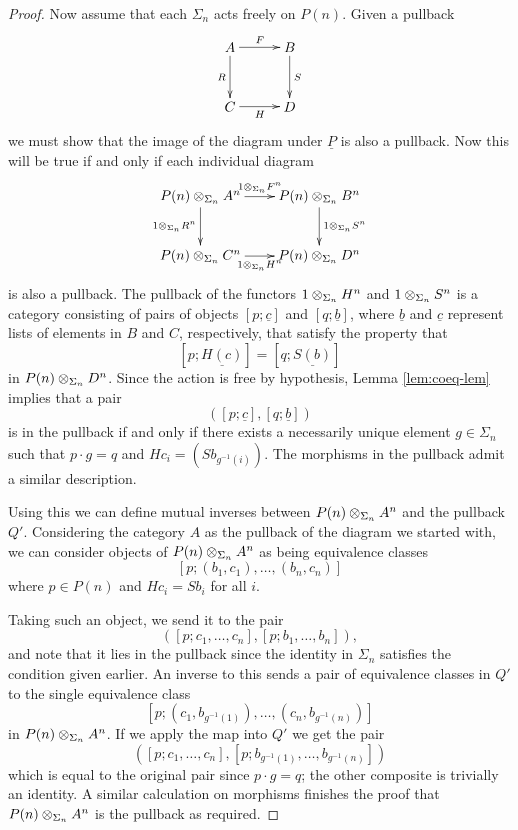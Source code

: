 \begin{proof}
Now assume that each $\Sigma_n$ acts freely on $P(n)$. Given a pullback
    \[
        \xy
            (0,0)*+{A}="00";
            (15,0)*+{B}="10";
            (0,-15)*+{C}="01";
            (15,-15)*+{D}="11";
            {\ar^{F} "00" ; "10"};
            {\ar^{S} "10" ; "11"};
            {\ar_{R} "00" ; "01"};
            {\ar_{H} "01" ; "11"};
        \endxy
    \]
we must show that the image of the diagram under $\underline{P}$ is also a pullback. Now this will be true if and only if each individual diagram
        \[
            \xy
                (0,0)*+{\coeqsig{P}{A}{n}}="00";
                (30,0)*+{\coeqsig{P}{B}{n}}="10";
                (0,-15)*+{\coeqsig{P}{C}{n}}="01";
                (30,-15)*+{\coeqsig{P}{D}{n}}="11";
                {\ar^{\coeqb{1}{F^n}{\Sigma_{n}}} "00" ; "10"};
                {\ar^{\coeqb{1}{S^n}{\Sigma_{n}}} "10" ; "11"};
                {\ar_{\coeqb{1}{R^n}{\Sigma_{n}}} "00" ; "01"};
                {\ar_{\coeqb{1}{H^n}{\Sigma_{n}}} "01" ; "11"}:
            \endxy
    \]
is also a pullback. 
The pullback of the functors $\coeqb{1}{H^n}{\Sigma_{n}}$ and $\coeqb{1}{S^n}{\Sigma_{n}}$ is a category consisting of pairs of objects $[p;\underline{c}]$ and $[q;\underline{b}]$, where $\underline{b}$ and $\underline{c}$ represent lists of elements in $B$ and $C$, respectively, that satisfy the property that
    \[
        \left[p;\underline{H(c)}\right] = \left[q; \underline{S(b)}\right]
    \]
    in $\coeqsig{P}{D}{n}$.
Since the action is free by hypothesis, Lemma \ref{lem:coeq-lem} implies that a pair
    \[
        \left(\left[p;\underline{c}\right], \left[q;\underline{b}\right]\right)
    \]
is in the pullback if and only if there exists a necessarily unique element $g \in \Sigma_n$ such that $p \cdot g = q$ and $Hc_i = (Sb_{g^{-1}(i)})$. 
The morphisms in the pullback admit a similar description.

Using this we can define mutual inverses between $\coeqsig{P}{A}{n}$ and the pullback $Q'$. Considering the category $A$ as the pullback of the diagram we started with, we can consider objects of $\coeqsig{P}{A}{n}$ as being equivalence classes
    \[
        [p;(b_1,c_1),\ldots,(b_n,c_n)]
    \]
where $p \in P(n)$ and $Hc_i = Sb_i$ for all $i$.

Taking such an object, we send it to the pair
    \[
        \left(\left[p;c_1,\ldots,c_n\right],[p;b_1,\ldots,b_n]\right),
    \]
and note that it lies in the pullback since the identity in $\Sigma_n$ satisfies the condition given earlier. An inverse to this sends a pair of equivalence classes in $Q'$ to the single equivalence class
    \[
        \left[p;\left(c_1,b_{g^{-1}(1)}\right),\ldots,\left(c_n,b_{g^{-1}(n)}\right)\right]
    \]
in $\coeqsig{P}{A}{n}$. If we apply the map into $Q'$ we get the pair
    \[
        \left(\left[p;c_1,\ldots,c_n\right],\left[p;b_{g^{-1}(1)},\ldots,b_{g^{-1}(n)}\right]\right)
    \]
which is equal to the original pair since $p \cdot g = q$; the other composite is trivially an identity. A similar calculation on morphisms finishes the proof that $\coeqsig{P}{A}{n}$ is the pullback as required.
\end{proof}

